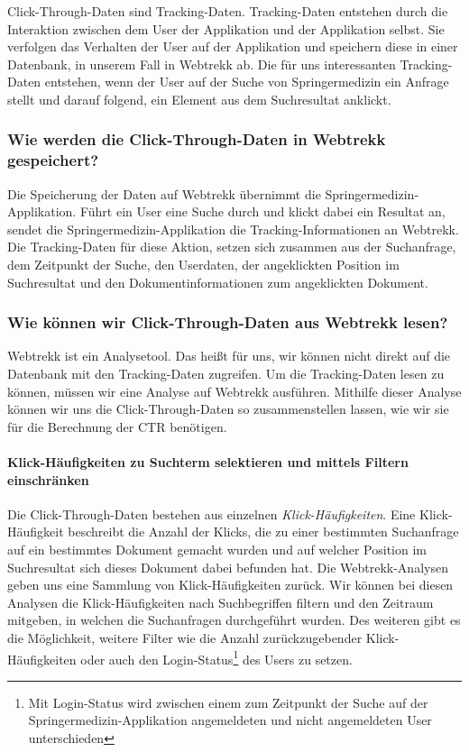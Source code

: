 Click-Through-Daten sind Tracking-Daten. Tracking-Daten entstehen durch die Interaktion zwischen dem User der Applikation und der Applikation selbst. Sie verfolgen das Verhalten der User auf der Applikation und speichern diese in einer Datenbank, in unserem Fall in Webtrekk ab. Die für uns interessanten Tracking-Daten entstehen, wenn der User auf der Suche von Springermedizin ein Anfrage stellt und darauf folgend, ein Element aus dem Suchresultat anklickt.

\subsubsection{Wie werden die Click-Through-Daten in Webtrekk gespeichert?}
\label{sec:Grundlagen:Grundbegriffe:Click-Through-Daten:SpeichernClick-Through-Daten}

Die Speicherung der Daten auf Webtrekk übernimmt die Springermedizin-Applikation. Führt ein User eine Suche durch und klickt dabei ein Resultat an, sendet die Springermedizin-Applikation die Tracking-Informationen an Webtrekk. Die Tracking-Daten für diese Aktion, setzen sich zusammen aus der Suchanfrage, dem Zeitpunkt der Suche, den Userdaten, der angeklickten Position im Suchresultat und den Dokumentinformationen zum angeklickten Dokument.

\subsubsection{Wie können wir Click-Through-Daten aus Webtrekk lesen?}
\label{sec:Grundlagen:Grundbegriffe:Click-Through-Daten:LesenClick-Through-Daten}

Webtrekk ist ein Analysetool. Das heißt für uns, wir können nicht direkt auf die Datenbank mit den Tracking-Daten zugreifen. Um die Tracking-Daten lesen zu können, müssen wir eine Analyse auf Webtrekk ausführen. Mithilfe dieser Analyse können wir uns die Click-Through-Daten so zusammenstellen lassen, wie wir sie für die Berechnung der CTR benötigen.

\paragraph{Klick-Häufigkeiten zu Suchterm selektieren und mittels Filtern einschränken} 
Die Click-Through-Daten bestehen aus einzelnen \textit{Klick-Häufigkeiten}. Eine Klick-Häufigkeit beschreibt die Anzahl der Klicks, die zu einer bestimmten Suchanfrage auf ein bestimmtes Dokument gemacht wurden und auf welcher Position im Suchresultat sich dieses Dokument dabei befunden hat. Die Webtrekk-Analysen geben uns eine Sammlung von Klick-Häufigkeiten zurück. Wir können bei diesen Analysen die Klick-Häufigkeiten nach Suchbegriffen filtern und den Zeitraum mitgeben, in welchen die Suchanfragen durchgeführt wurden. Des weiteren gibt es die Möglichkeit, weitere Filter wie die Anzahl zurückzugebender Klick-Häufigkeiten oder auch den \glqq Login-Status\footnote{Mit Login-Status wird zwischen einem zum Zeitpunkt der Suche auf der Springermedizin-Applikation angemeldeten und nicht angemeldeten User unterschieden} des Users\grqq{} zu setzen. 

